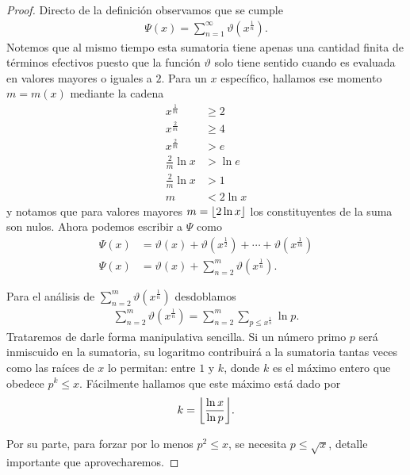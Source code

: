 \documentclass[10pt]{article}
\DeclarePairedDelimiter\floor{\lfloor}{\rfloor}
\theoremstyle{definition}
\theoremstyle{remark}
\begin{document}
\begin{proof}
Directo de la definici\'on observamos que se cumple 
\begin{align}
\Psi(x) = \sum_{n = 1}^\infty \vartheta(x^\frac{1}{n}).
\end{align}
Notemos que al mismo tiempo esta sumatoria tiene apenas una cantidad finita de t\'erminos efectivos puesto que la funci\'on $\vartheta$ 
solo tiene sentido cuando es evaluada en valores mayores o iguales a $2$. 
Para un $x$ espec\'ifico,  hallamos ese momento $m=m(x)$ mediante la cadena 
\begin{align}
x^\frac{1}{m} &\geq 2 \\
x^\frac{2}{m} &\geq 4 \\
x^\frac{2}{m} &> e \\
\frac{2}{m}\ln x &> \ln e \\
\frac{2}{m}\ln x &> 1 \\
m &< 2 \ln x
\end{align}
y notamos que para valores mayores $m = \floor{2 \ln x}$ los constituyentes de la suma son nulos.
Ahora podemos escribir a $\Psi$ como 
\begin{align}
\Psi(x) &= \vartheta(x) + \vartheta(x^\frac{1}{2}) + \cdots + \vartheta(x^\frac{1}{m}) \\
\Psi(x) &= \vartheta(x) + \sum_{n = 2}^m \vartheta(x^\frac{1}{n}).
\end{align}

Para el an\'alisis de $\sum_{n = 2}^m \vartheta(x^\frac{1}{n})$ desdoblamos 
\begin{align}
\sum_{n = 2}^m \vartheta(x^\frac{1}{n}) = \sum_{n = 2}^m \sum_{p \leq x^\frac{1}{n}} \ln p. 
\end{align}
Trataremos de darle forma manipulativa sencilla. 
Si un n\'umero primo $p$ ser\'a inmiscuido en la sumatoria, 
su logaritmo contribuir\'a a la sumatoria tantas veces como las ra\'ices de $x$ lo permitan: 
entre $1$ y $k$, donde $k$ es el m\'aximo entero que obedece $p^k \le x$.  
F\'acilmente hallamos que este m\'aximo est\'a dado por 
\begin{align}
k = \floor*{\frac{\ln x}{\ln p}}.
\end{align}

Por su parte, para forzar por lo menos $p^2 \le x$, se necesita $p \le \sqrt{x}$,
detalle importante que aprovecharemos.


\end{proof}
\end{document}
